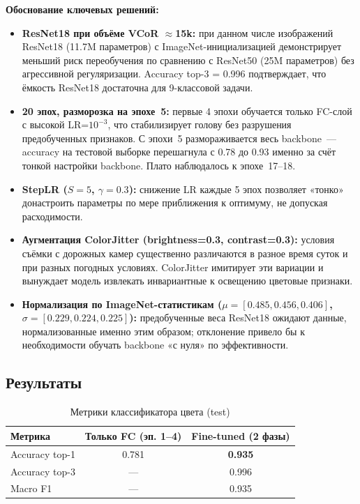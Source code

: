 \documentclass[14pt,a4paper]{report}
\numberwithin{equation}{chapter}
\numberwithin{figure}{chapter}
\numberwithin{table}{chapter}
\begin{document}
\textbf{Обоснование ключевых решений:}
\begin{itemize}
  \item \textbf{ResNet18 при объёме VCoR $\approx$15k:}
    при данном числе изображений ResNet18 (11.7M параметров)
    с ImageNet-инициализацией демонстрирует меньший риск
    переобучения по сравнению с ResNet50 (25M параметров)
    без агрессивной регуляризации. Accuracy top-3 = 0.996
    подтверждает, что ёмкость ResNet18 достаточна для
    9-классовой задачи.

  \item \textbf{20 эпох, разморозка на эпохе~5:}
    первые 4 эпохи обучается только FC-слой с высокой
    LR=$10^{-3}$, что стабилизирует голову без разрушения
    предобученных признаков. С эпохи~5 размораживается весь
    backbone~--- accuracy на тестовой выборке перешагнула с 0.78 до 0.93
    именно за счёт тонкой настройки backbone.
    Плато наблюдалось к эпохе~17--18.

  \item \textbf{StepLR ($S=5$, $\gamma=0.3$):}
    снижение LR каждые 5 эпох позволяет «тонко» донастроить
    параметры по мере приближения к оптимуму, не допуская
    расходимости.

  \item \textbf{Аугментация ColorJitter (brightness=0.3,
    contrast=0.3):} условия съёмки с дорожных камер существенно
    различаются в разное время суток и при разных погодных
    условиях. ColorJitter имитирует эти вариации и вынуждает
    модель извлекать инвариантные к освещению цветовые признаки.

  \item \textbf{Нормализация по ImageNet-статистикам
    ($\mu=[0.485, 0.456, 0.406]$, $\sigma=[0.229, 0.224, 0.225]$):}
    предобученные веса ResNet18 ожидают данные, нормализованные
    именно этим образом; отклонение привело бы к необходимости
    обучать backbone «с нуля» по эффективности.
\end{itemize}

\subsection{Результаты}

\begin{table}[H]
\centering
\caption{Метрики классификатора цвета (test)}
\label{tab:color_metrics}
\begin{tabular}{lcc}
\toprule
\textbf{Метрика} & \textbf{Только FC (эп. 1--4)} & \textbf{Fine-tuned (2 фазы)} \\
\midrule
Accuracy top-1 & 0.781 & \textbf{0.935} \\
Accuracy top-3 & --- & 0.996 \\
Macro F1       & --- & 0.935 \\
\bottomrule
\end{tabular}
\end{table}
\end{document}
